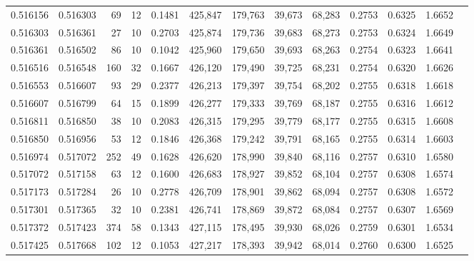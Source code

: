 \begin{tabular}{rrrrrrrrrrrrr}
0.516156 & 0.516303 &    69 &  12 &                                     0.1481 & 425,847 & 179,763 &  39,673 &  68,283 & 0.2753 & 0.6325 & 1.6652 \\
0.516303 & 0.516361 &    27 &  10 &                                     0.2703 & 425,874 & 179,736 &  39,683 &  68,273 & 0.2753 & 0.6324 & 1.6649 \\
0.516361 & 0.516502 &    86 &  10 &                                     0.1042 & 425,960 & 179,650 &  39,693 &  68,263 & 0.2754 & 0.6323 & 1.6641 \\
0.516516 & 0.516548 &   160 &  32 &                                     0.1667 & 426,120 & 179,490 &  39,725 &  68,231 & 0.2754 & 0.6320 & 1.6626 \\
0.516553 & 0.516607 &    93 &  29 &                                     0.2377 & 426,213 & 179,397 &  39,754 &  68,202 & 0.2755 & 0.6318 & 1.6618 \\
0.516607 & 0.516799 &    64 &  15 &                                     0.1899 & 426,277 & 179,333 &  39,769 &  68,187 & 0.2755 & 0.6316 & 1.6612 \\
0.516811 & 0.516850 &    38 &  10 &                                     0.2083 & 426,315 & 179,295 &  39,779 &  68,177 & 0.2755 & 0.6315 & 1.6608 \\
0.516850 & 0.516956 &    53 &  12 &                                     0.1846 & 426,368 & 179,242 &  39,791 &  68,165 & 0.2755 & 0.6314 & 1.6603 \\
0.516974 & 0.517072 &   252 &  49 &                                     0.1628 & 426,620 & 178,990 &  39,840 &  68,116 & 0.2757 & 0.6310 & 1.6580 \\
0.517072 & 0.517158 &    63 &  12 &                                     0.1600 & 426,683 & 178,927 &  39,852 &  68,104 & 0.2757 & 0.6308 & 1.6574 \\
0.517173 & 0.517284 &    26 &  10 &                                     0.2778 & 426,709 & 178,901 &  39,862 &  68,094 & 0.2757 & 0.6308 & 1.6572 \\
0.517301 & 0.517365 &    32 &  10 &                                     0.2381 & 426,741 & 178,869 &  39,872 &  68,084 & 0.2757 & 0.6307 & 1.6569 \\
0.517372 & 0.517423 &   374 &  58 &                                     0.1343 & 427,115 & 178,495 &  39,930 &  68,026 & 0.2759 & 0.6301 & 1.6534 \\
0.517425 & 0.517668 &   102 &  12 &                                     0.1053 & 427,217 & 178,393 &  39,942 &  68,014 & 0.2760 & 0.6300 & 1.6525 \\

\end{tabular}
